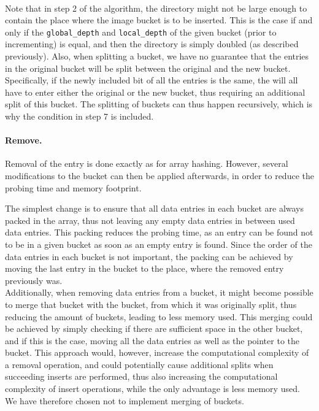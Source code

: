 \documentclass[11pt]{article} %
\begin{document}
\vphantom{fill}\\
Note that in step 2 of the algorithm, the directory might not be large enough to contain the place where the image bucket is to be inserted. This is the case if and only if the \verb|global_depth| and \verb|local_depth| of the given bucket (prior to incrementing) is equal, and then the directory is simply doubled (as described previously). Also, when splitting a bucket, we have no guarantee that the entries in the original bucket will be split between the original and the new bucket. Specifically, if the newly included bit of all the entries is the same, the will all have to enter either the original or the new bucket, thus requiring an additional split of this bucket. The splitting of buckets can thus happen recursively, which is why the condition in step 7 is included.

\paragraph{Remove.} Removal of the entry is done exactly as for array hashing. However, several modifications to the bucket can then be applied afterwards, in order to reduce the probing time and memory footprint.

The simplest change is to ensure that all data entries in each bucket are always packed in the array, thus not leaving any empty data entries in between used data entries. This packing reduces the probing time, as an entry can be found not to be in a given bucket as soon as an empty entry is found. Since the order of the data entries in each bucket is not important, the packing can be achieved by moving the last entry in the bucket to the place, where the removed entry previously was.\\

Additionally, when removing data entries from a bucket, it might become possible to merge that bucket with the bucket, from which it was originally split, thus reducing the amount of buckets, leading to less memory used. This merging could be achieved by simply checking if there are sufficient space in the other bucket, and if this is the case, moving all the data entries as well as the pointer to the bucket. This approach would, however, increase the computational complexity of a removal operation, and could potentially cause additional splits when succeeding inserts are performed, thus also increasing the computational complexity of insert operations, while the only advantage is less memory used. We have therefore chosen not to implement merging of buckets.
\end{document}
